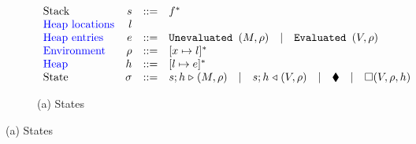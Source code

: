 
\begin{figure}[!ht]
\caption{The L Machine}
\begin{subfigure}[c]{\linewidth}   %
{\small
\caption*{(a) States}
\[
\begin{array}{lrcl}
        \textrm{Stack}           & s      & ::= & f^*\\
 \textcolor{blue}{ \textrm{Heap locations}} & l      &  & \\
 \textcolor{blue}{ \textrm{Heap entries}}   & e      & ::= & \texttt{Unevaluated } (M, \rho)\quad|\quad\texttt{Evaluated } (V,\rho) \\
 \textcolor{blue}{ \textrm{Environment}}    & \rho   & ::= & [x \mapsto l]^*\\
 \textcolor{blue}{ \textrm{Heap}}           & h      & ::= & [l \mapsto e]^*\\
        \textrm{State}           & \sigma & ::= & s;h \mathrel\triangleright (M,\rho) \quad| \quad s;h \mathrel\triangleleft (V, \rho)  \quad| \quad \blacklozenge{} \quad|\quad \square (V,\rho,h)
    \end{array}
\]
}
\end{subfigure}
\end{figure}
